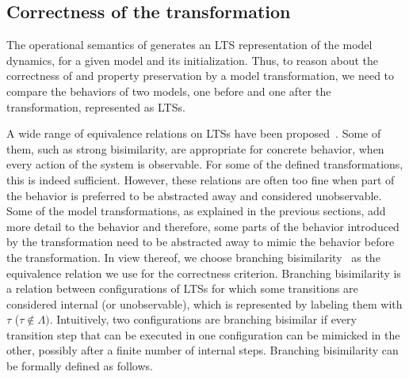 \subsection{Correctness of the \TSim transformation}
\label{subsec:reusable-correct-transformations:correctness_of_simple}

The operational semantics of \SLCO generates an LTS representation of the model dynamics, for a given model and its initialization.
Thus, to reason about the correctness of and property preservation by a model transformation, we need to compare the behaviors of two models, one before and one after the transformation, represented as LTSs.

A wide range of equivalence relations on LTSs have been proposed~\cite{spectrum2}.
Some of them, such as strong bisimilarity, are appropriate for concrete behavior, when every action of the system is observable.
For some of the defined \SLCO transformations, this is indeed sufficient.
However, these relations are often too fine when part of the behavior is preferred to be abstracted away and considered unobservable.
Some of the \SLCO model transformations, as explained in the previous sections, add more detail to the behavior and therefore, some parts of the behavior introduced by the transformation need to be  abstracted away to mimic the behavior before the transformation.
In view thereof, we choose branching bisimilarity~\cite{GlabWeijBisim96} as the equivalence relation we use for the correctness criterion.
Branching bisimilarity is a relation between configurations of LTSs for which some transitions are considered internal (or unobservable), which is represented by labeling them with $\tau$ ($\tau\notin \Lambda)$.
Intuitively, two configurations are branching bisimilar if every transition step that can be executed in one configuration can be mimicked in the other, possibly after a finite number of internal steps.
Branching bisimilarity can be formally defined as follows.

\clearpage


